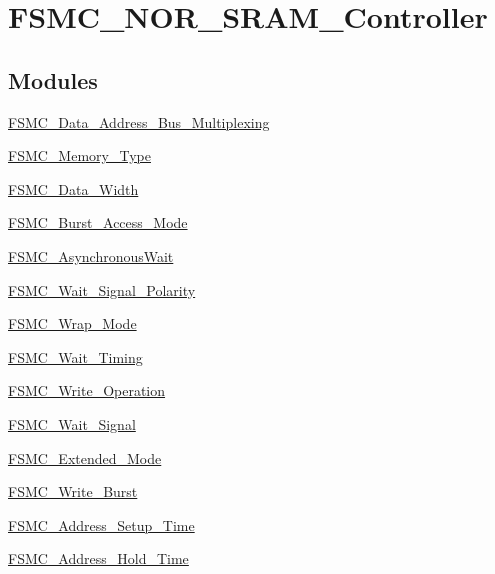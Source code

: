 \hypertarget{group___f_s_m_c___n_o_r___s_r_a_m___controller}{}\section{F\+S\+M\+C\+\_\+\+N\+O\+R\+\_\+\+S\+R\+A\+M\+\_\+\+Controller}
\label{group___f_s_m_c___n_o_r___s_r_a_m___controller}
\subsection*{Modules}
\begin{DoxyCompactItemize}
\item 
\hyperlink{group___f_s_m_c___data___address___bus___multiplexing}{F\+S\+M\+C\+\_\+\+Data\+\_\+\+Address\+\_\+\+Bus\+\_\+\+Multiplexing}
\item 
\hyperlink{group___f_s_m_c___memory___type}{F\+S\+M\+C\+\_\+\+Memory\+\_\+\+Type}
\item 
\hyperlink{group___f_s_m_c___data___width}{F\+S\+M\+C\+\_\+\+Data\+\_\+\+Width}
\item 
\hyperlink{group___f_s_m_c___burst___access___mode}{F\+S\+M\+C\+\_\+\+Burst\+\_\+\+Access\+\_\+\+Mode}
\item 
\hyperlink{group___f_s_m_c___asynchronous_wait}{F\+S\+M\+C\+\_\+\+Asynchronous\+Wait}
\item 
\hyperlink{group___f_s_m_c___wait___signal___polarity}{F\+S\+M\+C\+\_\+\+Wait\+\_\+\+Signal\+\_\+\+Polarity}
\item 
\hyperlink{group___f_s_m_c___wrap___mode}{F\+S\+M\+C\+\_\+\+Wrap\+\_\+\+Mode}
\item 
\hyperlink{group___f_s_m_c___wait___timing}{F\+S\+M\+C\+\_\+\+Wait\+\_\+\+Timing}
\item 
\hyperlink{group___f_s_m_c___write___operation}{F\+S\+M\+C\+\_\+\+Write\+\_\+\+Operation}
\item 
\hyperlink{group___f_s_m_c___wait___signal}{F\+S\+M\+C\+\_\+\+Wait\+\_\+\+Signal}
\item 
\hyperlink{group___f_s_m_c___extended___mode}{F\+S\+M\+C\+\_\+\+Extended\+\_\+\+Mode}
\item 
\hyperlink{group___f_s_m_c___write___burst}{F\+S\+M\+C\+\_\+\+Write\+\_\+\+Burst}
\item 
\hyperlink{group___f_s_m_c___address___setup___time}{F\+S\+M\+C\+\_\+\+Address\+\_\+\+Setup\+\_\+\+Time}
\item 
\hyperlink{group___f_s_m_c___address___hold___time}{F\+S\+M\+C\+\_\+\+Address\+\_\+\+Hold\+\_\+\+Time}

\end{DoxyCompactItemize}
